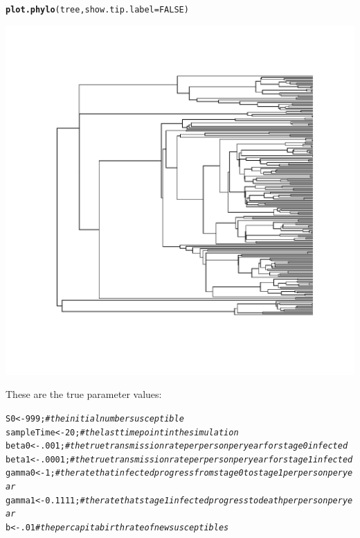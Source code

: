 \documentclass[english]{article}\usepackage[]{graphicx}\usepackage[]{color}
\makeatletter
\def\maxwidth{ %
  \ifdim\Gin@nat@width>\linewidth
    \linewidth
  \else
    \Gin@nat@width
  \fi
}
\newcommand{\hlnum}[1]{\textcolor[rgb]{0.686,0.059,0.569}{#1}}%
\newcommand{\hlcom}[1]{\textcolor[rgb]{0.678,0.584,0.686}{\textit{#1}}}%
\newcommand{\hlstd}[1]{\textcolor[rgb]{0.345,0.345,0.345}{#1}}%
\newcommand{\hlkwb}[1]{\textcolor[rgb]{0.69,0.353,0.396}{#1}}%
\newcommand{\hlkwc}[1]{\textcolor[rgb]{0.333,0.667,0.333}{#1}}%
\newcommand{\hlkwd}[1]{\textcolor[rgb]{0.737,0.353,0.396}{\textbf{#1}}}%
\newenvironment{kframe}{%
 \def\at@end@of@kframe{}%
 \ifinner\ifhmode%
  \def\at@end@of@kframe{\end{minipage}}%
  \begin{minipage}{\columnwidth}%
 \fi\fi%
 \def\FrameCommand##1{\hskip\@totalleftmargin \hskip-\fboxsep
 \colorbox{shadecolor}{##1}\hskip-\fboxsep
     \hskip-\linewidth \hskip-\@totalleftmargin \hskip\columnwidth}%
 \MakeFramed {\advance\hsize-\width
   \@totalleftmargin\z@ \linewidth\hsize
   \@setminipage}}%
 {\par\unskip\endMakeFramed%
 \at@end@of@kframe}
\newenvironment{knitrout}{}{} %
\makeatother
\begin{document}
\begin{knitrout}
\color{fgcolor}\begin{kframe}
\begin{alltt}
\hlkwd{plot.phylo}\hlstd{(tree,} \hlkwc{show.tip.label} \hlstd{=} \hlnum{FALSE}\hlstd{)}
\end{alltt}
\end{kframe}
\includegraphics[width=\maxwidth]{figure/unnamed-chunk-5} 

\end{knitrout}


These are the true parameter values:

\begin{knitrout}
\color{fgcolor}\begin{kframe}
\begin{alltt}
\hlstd{S0} \hlkwb{<-} \hlnum{999}\hlstd{;} \hlcom{# the initial number susceptible}
\hlstd{sampleTime} \hlkwb{<-} \hlnum{20}\hlstd{;} \hlcom{# the last time point in the simulation }
\hlstd{beta0} \hlkwb{<-} \hlnum{.001}\hlstd{;} \hlcom{#the true transmission rate per person per year for stage 0 infected}
\hlstd{beta1} \hlkwb{<-} \hlnum{.0001}\hlstd{;} \hlcom{#the true transmission rate per person per year for stage 1 infected}
\hlstd{gamma0} \hlkwb{<-} \hlnum{1}\hlstd{;} \hlcom{# the rate that infected progress from stage 0 to stage 1 per person per year }
\hlstd{gamma1} \hlkwb{<-} \hlnum{0.1111}\hlstd{;} \hlcom{# the rate that stage 1 infected progress to death per person per year }
\hlstd{b} \hlkwb{<-} \hlnum{.01} \hlcom{# the per capita birth rate of new susceptibles}
\end{alltt}
\end{kframe}
\end{knitrout}
\end{document}
